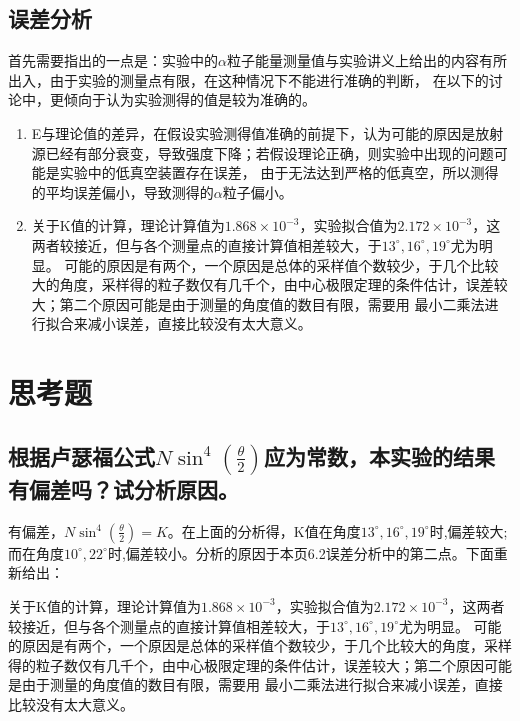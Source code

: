 \documentclass[a4paper,UTF8]{ctexart}
\begin{document}
\subsection{误差分析}

首先需要指出的一点是：实验中的$\alpha$粒子能量测量值与实验讲义上给出的内容有所出入，由于实验的测量点有限，在这种情况下不能进行准确的判断，
在以下的讨论中，更倾向于认为实验测得的值是较为准确的。

\begin{enumerate}
    \item E与理论值的差异，在假设实验测得值准确的前提下，认为可能的原因是放射源已经有部分衰变，导致强度下降；若假设理论正确，则实验中出现的问题可能是实验中的低真空装置存在误差，
    由于无法达到严格的低真空，所以测得的平均误差偏小，导致测得的$\alpha$粒子偏小。
    \item 关于K值的计算，理论计算值为$1.868 \times 10^{-3}$，实验拟合值为$2.172 \times 10^{-3}$，这两者较接近，但与各个测量点的直接计算值相差较大，于$13^\circ,16^\circ,19^\circ$尤为明显。
    可能的原因是有两个，一个原因是总体的采样值个数较少，于几个比较大的角度，采样得的粒子数仅有几千个，由中心极限定理的条件估计，误差较大；第二个原因可能是由于测量的角度值的数目有限，需要用
    最小二乘法进行拟合来减小误差，直接比较没有太大意义。
\end{enumerate}

\section{思考题}

\subsection{根据卢瑟福公式$N\sin^4{(\frac{\theta}{2})}$应为常数，本实验的结果有偏差吗？试分析原因。}

有偏差，$N\sin^4{(\frac{\theta}{2})} = K$。在上面的分析得，K值在角度$13^\circ,16^\circ,19^\circ$时,偏差较大;而在角度$10^\circ,22^\circ$时,偏差较小。分析的原因于本页6.2误差分析中的第二点。下面重新给出：

关于K值的计算，理论计算值为$1.868 \times 10^{-3}$，实验拟合值为$2.172 \times 10^{-3}$，这两者较接近，但与各个测量点的直接计算值相差较大，于$13^\circ,16^\circ,19^\circ$尤为明显。
    可能的原因是有两个，一个原因是总体的采样值个数较少，于几个比较大的角度，采样得的粒子数仅有几千个，由中心极限定理的条件估计，误差较大；第二个原因可能是由于测量的角度值的数目有限，需要用
    最小二乘法进行拟合来减小误差，直接比较没有太大意义。
\end{document}
